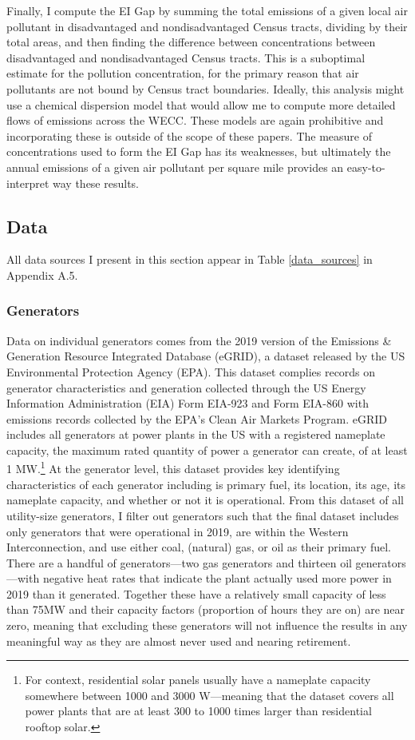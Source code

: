Finally, I compute the EI Gap by summing the total emissions of a given local air pollutant in disadvantaged and nondisadvantaged Census tracts, dividing by their total areas, and then finding the difference between concentrations between disadvantaged and nondisadvantaged Census tracts. This is a suboptimal estimate for the pollution concentration, for the primary reason that air pollutants are not bound by Census tract boundaries. Ideally, this analysis might use a chemical dispersion model that would allow me to compute more detailed flows of emissions across the WECC. These models are again prohibitive and incorporating these is outside of the scope of these papers. The measure of concentrations used to form the EI Gap has its weaknesses, but ultimately the annual emissions of a given air pollutant per square mile provides an easy-to-interpret way these results. 


\subsection{Data}

All data sources I present in this section appear in Table \ref{data_sources} in Appendix A.5.

\subsubsection*{Generators}

Data on individual generators comes from the 2019 version of the Emissions \& Generation Resource Integrated Database (eGRID), a dataset released by the US Environmental Protection Agency (EPA). This dataset complies records on generator characteristics and generation collected through the US Energy Information Administration (EIA) Form EIA-923 and Form EIA-860 with emissions records collected by the EPA's Clean Air Markets Program. eGRID includes all generators at power plants in the US with a registered nameplate capacity, the maximum rated quantity of power a generator can create, of at least 1 MW.\footnote{For context, residential solar panels usually have a nameplate capacity somewhere between 1000 and 3000 W---meaning that the dataset covers all power plants that are at least 300 to 1000 times larger than residential rooftop solar.} At the generator level, this dataset provides key identifying characteristics of each generator including is primary fuel, its location, its age, its nameplate capacity, and whether or not it is operational. From this dataset of all utility-size generators, I filter out generators such that the final dataset includes only generators that were operational in 2019, are within the Western Interconnection, and use either coal, (natural) gas, or oil as their primary fuel. There are a handful of generators---two gas generators and thirteen oil generators---with negative heat rates that indicate the plant actually used more power in 2019 than it generated. Together these have a relatively small capacity of less than 75MW and their capacity factors (proportion of hours they are on) are near zero, meaning that excluding these generators will not influence the results in any meaningful way as they are almost never used and nearing retirement. 

